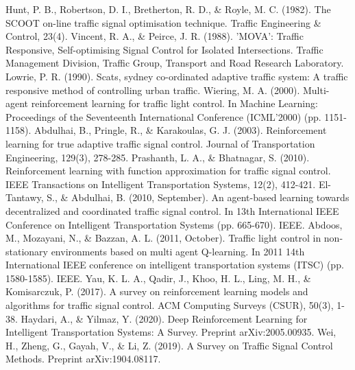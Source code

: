 \documentclass[a4paper, conference]{IEEEtran}
\begin{document}
\begin{thebibliography}{0}
 Hunt, P. B., Robertson, D. I., Bretherton, R. D., \& Royle, M. C. (1982). The SCOOT on-line traffic signal optimisation technique. Traffic Engineering \& Control, 23(4).
 Vincent, R. A., \& Peirce, J. R. (1988). 'MOVA': Traffic Responsive, Self-optimising Signal Control for Isolated Intersections. Traffic Management Division, Traffic Group, Transport and Road Research Laboratory.
 Lowrie, P. R. (1990). Scats, sydney co-ordinated adaptive traffic system: A traffic responsive method of controlling urban traffic.
 Wiering, M. A. (2000). Multi-agent reinforcement learning for traffic light control. In Machine Learning: Proceedings of the Seventeenth International Conference (ICML'2000) (pp. 1151-1158).
 Abdulhai, B., Pringle, R., \& Karakoulas, G. J. (2003). Reinforcement learning for true adaptive traffic signal control. Journal of Transportation Engineering, 129(3), 278-285.
 Prashanth, L. A., \& Bhatnagar, S. (2010). Reinforcement learning with function approximation for traffic signal control. IEEE Transactions on Intelligent Transportation Systems, 12(2), 412-421.
 El-Tantawy, S., \& Abdulhai, B. (2010, September). An agent-based learning towards decentralized and coordinated traffic signal control. In 13th International IEEE Conference on Intelligent Transportation Systems (pp. 665-670). IEEE.
 Abdoos, M., Mozayani, N., \& Bazzan, A. L. (2011, October). Traffic light control in non-stationary environments based on multi agent Q-learning. In 2011 14th International IEEE conference on intelligent transportation systems (ITSC) (pp. 1580-1585). IEEE.
 Yau, K. L. A., Qadir, J., Khoo, H. L., Ling, M. H., \& Komisarczuk, P. (2017). A survey on reinforcement learning models and algorithms for traffic signal control. ACM Computing Surveys (CSUR), 50(3), 1-38.
 Haydari, A., \& Yilmaz, Y. (2020). Deep Reinforcement Learning for Intelligent Transportation Systems: A Survey. Preprint arXiv:2005.00935.
 Wei, H., Zheng, G., Gayah, V., \& Li, Z. (2019). A Survey on Traffic Signal Control Methods. Preprint arXiv:1904.08117.



\end{thebibliography}
\end{document}
